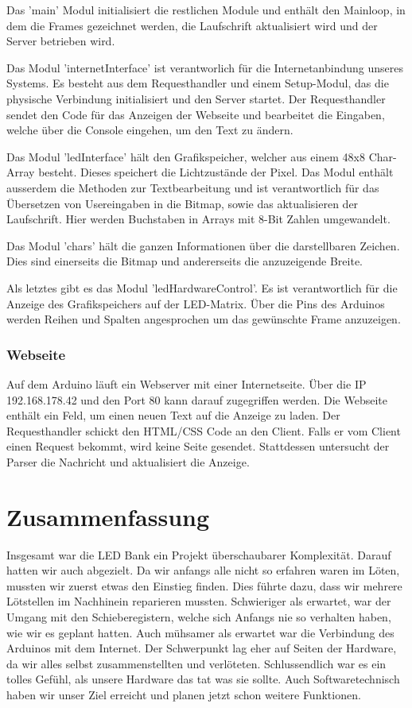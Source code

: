 \documentclass[10pt,a4paper]{article}
\begin{document}
Das 'main' Modul initialisiert die restlichen Module und enthält den Mainloop, in dem die Frames gezeichnet werden, die Laufschrift aktualisiert wird und der Server betrieben wird.

Das Modul 'internetInterface' ist verantworlich für die Internetanbindung unseres Systems. Es besteht aus dem Requesthandler und einem Setup-Modul, das die physische Verbindung initialisiert und den Server startet. Der Requesthandler sendet den Code für das Anzeigen der Webseite und bearbeitet die Eingaben, welche über die Console eingehen, um den Text zu ändern.

Das Modul 'ledInterface' hält den Grafikspeicher, welcher aus einem 48x8 Char-Array besteht. Dieses speichert die Lichtzustände der Pixel. Das Modul enthält ausserdem die Methoden zur Textbearbeitung und ist verantwortlich für das Übersetzen von Usereingaben in die Bitmap, sowie das aktualisieren der Laufschrift. Hier werden Buchstaben in Arrays mit 8-Bit Zahlen umgewandelt.

Das Modul 'chars' hält die ganzen Informationen über die darstellbaren Zeichen. Dies sind einerseits die Bitmap und andererseits die anzuzeigende Breite.

Als letztes gibt es das Modul 'ledHardwareControl'. Es ist verantwortlich für die Anzeige des Grafikspeichers auf der LED-Matrix. Über die Pins des Arduinos werden Reihen und Spalten angesprochen um das gewünschte Frame anzuzeigen.

\subsubsection{Webseite}

Auf dem Arduino läuft ein Webserver mit einer Internetseite. Über die IP 192.168.178.42 und den Port 80 kann darauf zugegriffen werden. Die Webseite enthält ein Feld, um einen neuen Text auf die Anzeige zu laden. Der Requesthandler schickt den HTML/CSS Code an den Client. Falls er vom Client einen Request bekommt, wird keine Seite gesendet. Stattdessen untersucht der Parser die Nachricht und aktualisiert die Anzeige.

\section{Zusammenfassung}

Insgesamt war die LED Bank ein Projekt überschaubarer Komplexität. Darauf hatten wir auch abgezielt. Da wir anfangs alle nicht so erfahren waren im Löten, mussten wir zuerst etwas den Einstieg finden. Dies führte dazu, dass wir mehrere Lötstellen im Nachhinein reparieren mussten. Schwieriger als erwartet, war der Umgang mit den Schieberegistern, welche sich Anfangs nie so verhalten haben, wie wir es geplant hatten. Auch mühsamer als erwartet war die Verbindung des Arduinos mit dem Internet. Der Schwerpunkt lag eher auf Seiten der Hardware, da wir alles selbst zusammenstellten und verlöteten. Schlussendlich war es ein tolles Gefühl, als unsere Hardware das tat was sie sollte. Auch Softwaretechnisch haben wir unser Ziel erreicht und planen jetzt schon weitere Funktionen.
\end{document}
